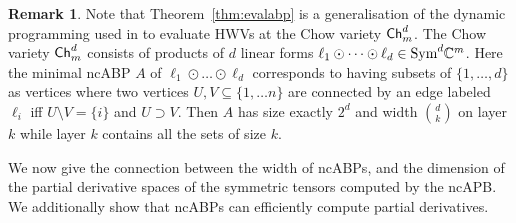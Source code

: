 \documentclass[10pt,a4paper]{article}
\numberwithin{equation}{section}
\theoremstyle{definition}
\newtheorem{remark}[equation]{Remark}
\newcommand{\Sym}{\textup{Sym}}
\newcommand{\IC}{\mathbb{C}}
\newcommand{\Ch}{\textup{\textsf{Ch}}}
\begin{document}
\begin{remark}
    Note that Theorem~\ref{thm:evalabp} is a generalisation of the dynamic programming used in \cite{DBLP:conf/icalp/DorflerIP19} to evaluate HWVs at the Chow variety $\Ch^d_m$.
    The Chow variety $\Ch^d_m$ consists of products of $d$ linear forms $\ell_1 \odot \dots \odot \ell_d \in \Sym^d \IC^m$.
    Here the minimal ncABP $A$ of $\ell_1 \odot \dots \odot \ell_d$ corresponds to having subsets of $\{1, \ldots, d\}$ as vertices where two vertices $U, V \subseteq \{1, \ldots n\}$ are connected by an edge labeled $\ell_i$ iff $U \setminus V = \{i\}$ and $U \supset V$.
    Then $A$ has size exactly $2^d$ and width $\binom{d}{k}$ on layer $k$ while layer $k$ contains all the sets of size $k$.
\end{remark}

We now give the connection between the width of ncABPs, and the dimension of the partial derivative spaces of the symmetric tensors computed by the ncAPB.
We additionally show that ncABPs can efficiently compute partial derivatives.
\end{document}
